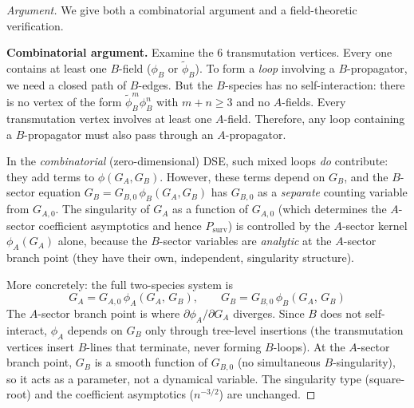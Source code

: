 \documentclass[11pt,a4paper]{article}
\theoremstyle{definition}
\newcommand{\phit}{\tilde{\phi}}
\newcommand{\Psurv}{P_{\mathrm{surv}}}
\begin{document}
\begin{proof}[Argument]
We give both a combinatorial argument and a field-theoretic verification.

\medskip\noindent
\textbf{Combinatorial argument.}
Examine the 6 transmutation vertices. Every one contains at least
one $B$-field ($\phi_B$ or $\phit_B$). To form a \emph{loop} involving
a $B$-propagator, we need a closed path of $B$-edges. But the $B$-species
has no self-interaction: there is no vertex of the form
$\phit_B^m \phi_B^n$ with $m + n \geq 3$ and no $A$-fields. Every
transmutation vertex involves at least one $A$-field. Therefore, any
loop containing a $B$-propagator must also pass through an $A$-propagator.

In the \emph{combinatorial} (zero-dimensional) DSE, such mixed loops
\emph{do} contribute: they add terms to $\phi(G_A, G_B)$. However,
these terms depend on $G_B$, and the $B$-sector equation
$G_B = G_{B,0}\,\phi_B(G_A, G_B)$ has $G_{B,0}$ as a \emph{separate}
counting variable from $G_{A,0}$. The singularity of $G_A$ as a
function of $G_{A,0}$ (which determines the $A$-sector coefficient
asymptotics and hence $\Psurv$) is controlled by the $A$-sector
kernel $\phi_A(G_A)$ alone, because the $B$-sector variables are
\emph{analytic} at the $A$-sector branch point (they have their own,
independent, singularity structure).

More concretely: the full two-species system is
\[
G_A = G_{A,0}\,\phi_A(G_A,\, G_B), \qquad
G_B = G_{B,0}\,\phi_B(G_A,\, G_B)
\]
The $A$-sector branch point is where $\partial \phi_A / \partial G_A$
diverges. Since $B$ does not self-interact, $\phi_A$ depends on $G_B$
only through tree-level insertions (the transmutation vertices insert
$B$-lines that terminate, never forming $B$-loops). At the $A$-sector
branch point, $G_B$ is a smooth function of $G_{B,0}$ (no simultaneous
$B$-singularity), so it acts as a parameter, not a dynamical variable.
The singularity type (square-root) and the coefficient asymptotics
($n^{-3/2}$) are unchanged.


\end{proof}
\end{document}
